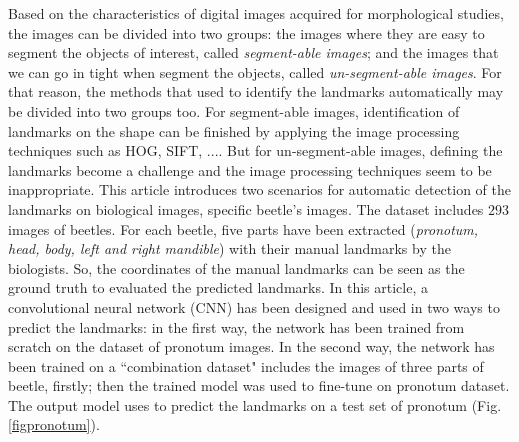 \documentclass[10pt]{article}
\begin{document}
Based on the characteristics of digital images acquired for morphological studies, the images can be divided into two groups: the images where they are easy to segment the objects of interest, called \textit{segment-able images}; and the images that we can go in tight when segment the objects, called \textit{un-segment-able images}. For that reason, the methods that used to identify the landmarks automatically may be divided into two groups too. For segment-able images, identification of landmarks on the shape can be finished by applying the image processing techniques such as HOG\cite{palaniswamy2010automatic}, SIFT\cite{lowe2004distinctive}, .... But for un-segment-able images, defining the landmarks become a challenge and the image processing techniques seem to be inappropriate. This article introduces two scenarios for automatic detection of the landmarks on biological images, specific beetle's images. The dataset includes $293$ images of beetles. For each beetle, five parts have been extracted (\textit{pronotum, head, body, left and right mandible}) with their manual landmarks by the biologists. So, the coordinates of the manual landmarks can be seen as the ground truth to evaluated the predicted landmarks.
In this article, a convolutional neural network (CNN)\cite{lecun2010convolutional} has been designed and used in two ways to predict the landmarks: in the first way, the network has been trained from scratch on the dataset of pronotum images. In the second way, the network has been trained on a  ``combination dataset" includes the images of three parts of beetle, firstly; then the trained model was used to fine-tune \cite{yosinski2014transferable} on pronotum dataset. The output model uses to predict the landmarks on a test set of pronotum (Fig.\ref{figpronotum}). 




\end{document}
